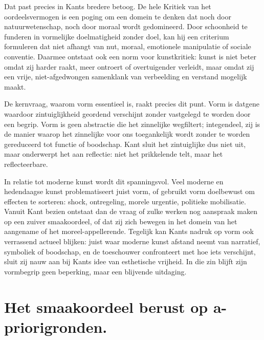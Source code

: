 \begin{mdframed}[leftmargin=0pt,rightmargin=0pt,backgroundcolor=blue!6,linecolor=white,innertopmargin=6pt,innerbottommargin=6pt]
Dat past precies in Kants bredere betoog. De hele Kritiek van het oordeelsvermogen is een poging om een domein te denken dat noch door natuurwetenschap, noch door moraal wordt gedomineerd. Door schoonheid te funderen in vormelijke doelmatigheid zonder doel, kan hij een criterium formuleren dat niet afhangt van nut, moraal, emotionele manipulatie of sociale conventie. Daarmee ontstaat ook een norm voor kunstkritiek: kunst is niet beter omdat zij harder raakt, meer ontroert of overtuigender verleidt, maar omdat zij een vrije, niet-afgedwongen samenklank van verbeelding en verstand mogelijk maakt.

De kernvraag, waarom vorm essentieel is, raakt precies dit punt. Vorm is datgene waardoor zintuiglijkheid geordend verschijnt zonder vastgelegd te worden door een begrip. Vorm is geen abstractie die het zinnelijke wegfiltert; integendeel, zij is de manier waarop het zinnelijke voor ons toegankelijk wordt zonder te worden gereduceerd tot functie of boodschap. Kant sluit het zintuiglijke dus niet uit, maar onderwerpt het aan reflectie: niet het prikkelende telt, maar het reflecteerbare.

In relatie tot moderne kunst wordt dit spanningsvol. Veel moderne en hedendaagse kunst problematiseert juist vorm, of gebruikt vorm doelbewust om effecten te sorteren: shock, ontregeling, morele urgentie, politieke mobilisatie. Vanuit Kant bezien ontstaat dan de vraag of zulke werken nog aanspraak maken op een zuiver smaakoordeel, of dat zij zich bewegen in het domein van het aangename of het moreel-appellerende. Tegelijk kan Kants nadruk op vorm ook verrassend actueel blijken: juist waar moderne kunst afstand neemt van narratief, symboliek of boodschap, en de toeschouwer confronteert met hoe iets verschijnt, sluit zij nauw aan bij Kants idee van esthetische vrijheid. In die zin blijft zijn vormbegrip geen beperking, maar een blijvende uitdaging.
\end{mdframed}

\section{Het smaakoordeel berust op a-priorigronden.}

